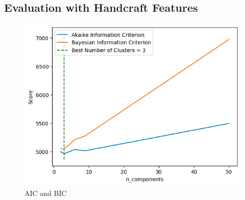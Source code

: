 \documentclass{template}
\begin{document}
\subsection{Evaluation with Handcraft Features}
\begin{figure}
\includegraphics[scale=0.5]{m2.png}
\caption{AIC and BIC}
\label{fig:logo}
\end{figure}
\end{document}

